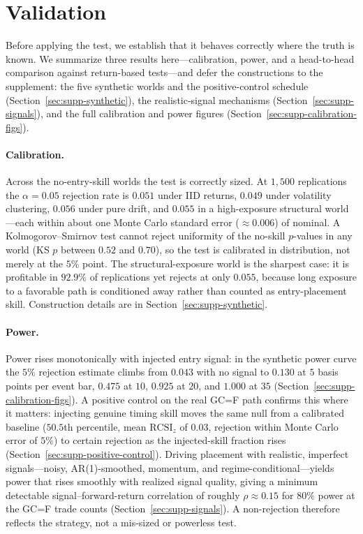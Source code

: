 \section{Validation}
\label{sec:simulation-validation}

Before applying the test, we establish that it behaves correctly where the truth is known. We summarize three results here---calibration, power, and a head-to-head comparison against return-based tests---and defer the constructions to the supplement: the five synthetic worlds and the positive-control schedule (Section~\ref{sec:supp-synthetic}), the realistic-signal mechanisms (Section~\ref{sec:supp-signals}), and the full calibration and power figures (Section~\ref{sec:supp-calibration-figs}).

\paragraph{Calibration.} Across the no-entry-skill worlds the test is correctly sized. At $1{,}500$ replications the $\alpha=0.05$ rejection rate is $0.051$ under IID returns, $0.049$ under volatility clustering, $0.056$ under pure drift, and $0.055$ in a high-exposure structural world---each within about one Monte Carlo standard error ($\approx 0.006$) of nominal. A Kolmogorov--Smirnov test cannot reject uniformity of the no-skill $p$-values in any world (KS $p$ between $0.52$ and $0.70$), so the test is calibrated in distribution, not merely at the $5\%$ point. The structural-exposure world is the sharpest case: it is profitable in $92.9\%$ of replications yet rejects at only $0.055$, because long exposure to a favorable path is conditioned away rather than counted as entry-placement skill. Construction details are in Section~\ref{sec:supp-synthetic}.

\paragraph{Power.} Power rises monotonically with injected entry signal: in the synthetic power curve the $5\%$ rejection estimate climbs from $0.043$ with no signal to $0.130$ at $5$ basis points per event bar, $0.475$ at $10$, $0.925$ at $20$, and $1.000$ at $35$ (Section~\ref{sec:supp-calibration-figs}). A positive control on the real GC=F path confirms this where it matters: injecting genuine timing skill moves the same null from a calibrated baseline ($50.5$th percentile, mean $\mathrm{RCSI}_z$ of $0.03$, rejection within Monte Carlo error of $5\%$) to certain rejection as the injected-skill fraction rises (Section~\ref{sec:supp-positive-control}). Driving placement with realistic, imperfect signals---noisy, AR(1)-smoothed, momentum, and regime-conditional---yields power that rises smoothly with realized signal quality, giving a minimum detectable signal--forward-return correlation of roughly $\rho\approx0.15$ for $80\%$ power at the GC=F trade counts (Section~\ref{sec:supp-signals}). A non-rejection therefore reflects the strategy, not a mis-sized or powerless test.

